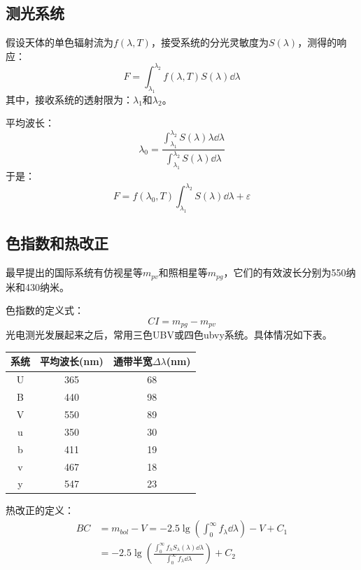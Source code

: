 \subsection{测光系统}
假设天体的单色辐射流为$f(\lambda ,T)$，接受系统的分光灵敏度为$S(\lambda)$，测得的响应：
\begin{equation}
	F=\int_{\lambda_{1}}^{\lambda_{2}}f(\lambda,T)S(\lambda) \dd \lambda
\end{equation}
其中，接收系统的透射限为：$\lambda_{1}$和$\lambda_{2}$。

平均波长：
\begin{equation}
	\lambda_{0}=\frac{\int_{\lambda_{1}}^{\lambda_{2}}S(\lambda)\lambda \dd \lambda}{\int_{\lambda_{1}}^{\lambda_{2}}S(\lambda)\dd \lambda}
\end{equation}
于是：
\begin{equation}
	F=f(\lambda_{0},T)\int_{\lambda_{1}}^{\lambda_{2}}S(\lambda)\dd \lambda +\varepsilon
\end{equation}

\subsection{色指数和热改正}
最早提出的国际系统有仿视星等$m_{pv}$和照相星等$m_{pg}$，它们的有效波长分别为550纳米和430纳米。

色指数的定义式：
\begin{equation}
	CI=m_{pg}-m_{pv}
\end{equation}
光电测光发展起来之后，常用三色UBV或四色ubvy系统。具体情况如下表。
\begin{table}[!htbp]
	\centering
	\begin{tabular}{|c|c|c|}
		\hline
		系统&平均波长(nm)&通带半宽$\Delta\lambda$(nm) \\
		\hline
 		U&365&68\\
 		\hline 
		B&440&98\\
		\hline 
		V&550&89\\
		\hline 
		u&350&30\\
		\hline 
		b&411&19\\
		\hline 
		v&467&18\\
		\hline 
		y&547&23\\
		\hline
	\end{tabular}
\end{table}

热改正的定义：
\begin{equation}
	\begin{split}
		BC&=m_{bol}-V=-2.5\lg\left(\int_{0}^{\infty}f_{\lambda}\dd \lambda \right)-V+C_{1}\\
		&=-2.5\lg\left(\frac{\int_{0}^{\infty}f_{\lambda}S_{\lambda}(\lambda)\dd \lambda}{\int_{0}^{\infty}f_{\lambda}\dd \lambda}\right)+C_{2}
	\end{split}
\end{equation}


